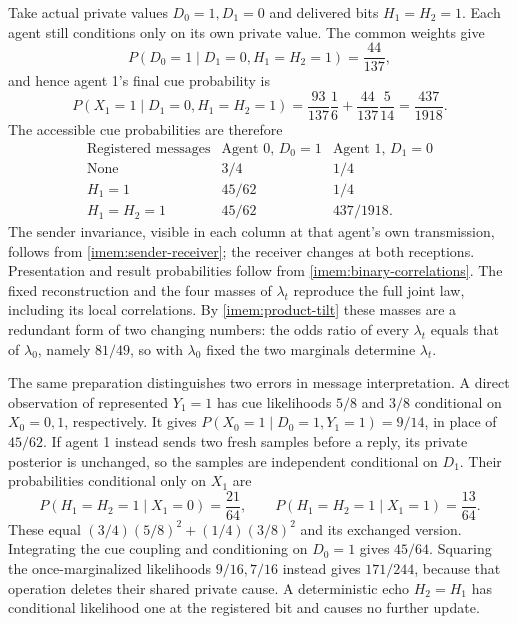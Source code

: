 Take actual private values $D_0=1,D_1=0$ and delivered bits $H_1=H_2=1$. Each agent still conditions only on its own private value. The common weights give
\begin{equation}
 P(D_0=1\mid D_1=0,H_1=H_2=1)=\frac{44}{137},
\end{equation}
and hence agent 1's final cue probability is
\begin{equation}
 P(X_1=1\mid D_1=0,H_1=H_2=1)
 =\frac{93}{137}\frac16+\frac{44}{137}\frac5{14}
 =\frac{437}{1918}.
 \label{imem:binary-second-posterior}
\end{equation}
The accessible cue probabilities are therefore
\begin{equation}
 \begin{array}{c|cc}
 \text{Registered messages}&\text{Agent 0, }D_0=1&\text{Agent 1, }D_1=0\\ \hline
 \text{None}&3/4&1/4\\
 H_1=1&45/62&1/4\\
 H_1=H_2=1&45/62&437/1918.
 \end{array}
 \label{imem:binary-exchange}
\end{equation}
The sender invariance, visible in each column at that agent's own transmission, follows from \cref{imem:sender-receiver}; the receiver changes at both receptions. Presentation and result probabilities follow from \cref{imem:binary-correlations}. The fixed reconstruction and the four masses of $\lambda_t$ reproduce the full joint law, including its local correlations. By \cref{imem:product-tilt} these masses are a redundant form of two changing numbers: the odds ratio of every $\lambda_t$ equals that of $\lambda_0$, namely $81/49$, so with $\lambda_0$ fixed the two marginals determine $\lambda_t$.

The same preparation distinguishes two errors in message interpretation. A direct observation of represented $Y_1=1$ has cue likelihoods $5/8$ and $3/8$ conditional on $X_0=0,1$, respectively. It gives $P(X_0=1\mid D_0=1,Y_1=1)=9/14$, in place of $45/62$. If agent 1 instead sends two fresh samples before a reply, its private posterior is unchanged, so the samples are independent conditional on $D_1$. Their probabilities conditional only on $X_1$ are
\begin{equation}
 P(H_1=H_2=1\mid X_1=0)=\frac{21}{64},\qquad
 P(H_1=H_2=1\mid X_1=1)=\frac{13}{64}.
 \label{imem:binary-repeated-samples}
\end{equation}
These equal $(3/4)(5/8)^2+(1/4)(3/8)^2$ and its exchanged version. Integrating the cue coupling and conditioning on $D_0=1$ gives $45/64$. Squaring the once-marginalized likelihoods $9/16,7/16$ instead gives $171/244$, because that operation deletes their shared private cause. A deterministic echo $H_2=H_1$ has conditional likelihood one at the registered bit and causes no further update.

